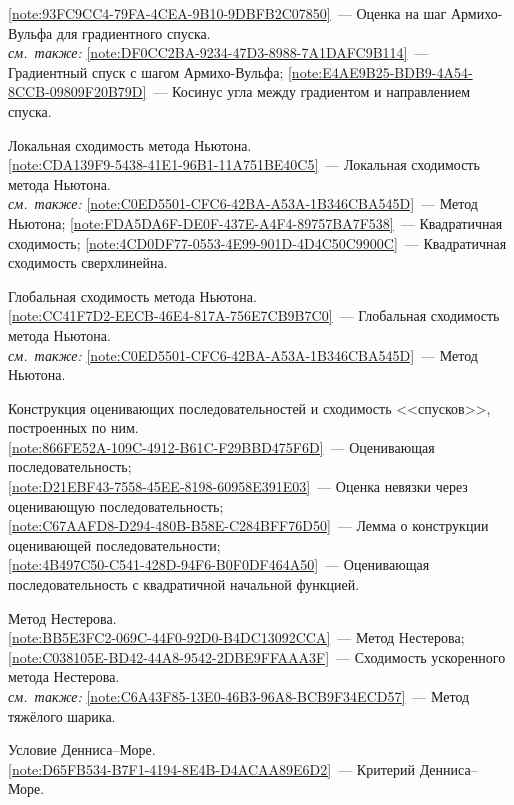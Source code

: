 \begin{description}[font=\normalfont\bfseries]
  \cref{note:93FC9CC4-79FA-4CEA-9B10-9DBFB2C07850}~--- Оценка на шаг Армихо-Вульфа для градиентного спуска.\\
  \emph{см.\ также:} \cref{note:DF0CC2BA-9234-47D3-8988-7A1DAFC9B114}~--- Градиентный спуск с шагом Армихо-Вульфа; \cref{note:E4AE9B25-BDB9-4A54-8CCB-09809F20B79D}~--- Косинус угла между градиентом и направлением спуска.
\item[Т16.] Локальная сходимость метода Ньютона.\\
  \cref{note:CDA139F9-5438-41E1-96B1-11A751BE40C5}~--- Локальная сходимость метода Ньютона.\\
  \emph{см.\ также:} \cref{note:C0ED5501-CFC6-42BA-A53A-1B346CBA545D}~--- Метод Ньютона; \cref{note:FDA5DA6F-DE0F-437E-A4F4-89757BA7F538}~--- Квадратичная сходимость; \cref{note:4CD0DF77-0553-4E99-901D-4D4C50C9900C}~--- Квадратичная сходимость сверхлинейна.
\item[Т17.] Глобальная сходимость метода Ньютона.\\
  \cref{note:CC41F7D2-EECB-46E4-817A-756E7CB9B7C0}~--- Глобальная сходимость метода Ньютона.\\
  \emph{см.\ также:} \cref{note:C0ED5501-CFC6-42BA-A53A-1B346CBA545D}~--- Метод Ньютона.
\item[Т18.] Конструкция оценивающих последовательностей и сходимость <<спусков>>, построенных по ним.\\
  \cref{note:866FE52A-109C-4912-B61C-F29BBD475F6D}~--- Оценивающая последовательность;\\
  \cref{note:D21EBF43-7558-45EE-8198-60958E391E03}~--- Оценка невязки через оценивающую последовательность;\\
  \cref{note:C67AAFD8-D294-480B-B58E-C284BFF76D50}~--- Лемма о конструкции оценивающей последовательности;\\
  \cref{note:4B497C50-C541-428D-94F6-B0F0DF464A50}~--- Оценивающая последовательность с квадратичной начальной функцией.
\item[Т19.] Метод Нестерова.\\
  \cref{note:BB5E3FC2-069C-44F0-92D0-B4DC13092CCA}~--- Метод Нестерова;\\
  \cref{note:C038105E-BD42-44A8-9542-2DBE9FFAAA3F}~--- Сходимость ускоренного метода Нестерова.\\
  \emph{см.\ также:} \cref{note:C6A43F85-13E0-46B3-96A8-BCB9F34ECD57}~--- Метод тяжёлого шарика.
\item[Т20.] Условие Денниса--Море.\\
  \cref{note:D65FB534-B7F1-4194-8E4B-D4ACAA89E6D2}~--- Критерий Денниса–Море.

\end{description}
